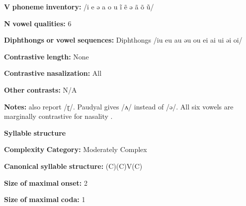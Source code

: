 \begin{styleBody}
\textbf{V} \textbf{phoneme} \textbf{inventory:} /i e ə a o u ĩ ẽ ə ã õ ũ/
\end{styleBody}

\begin{styleBody}
\textbf{N} \textbf{vowel} \textbf{qualities:} 6
\end{styleBody}

\begin{styleBody}
\textbf{Diphthongs} \textbf{or} \textbf{vowel} \textbf{sequences:} Diphthongs /iu eu au əu ou ei ai ui əi oi/
\end{styleBody}

\begin{styleBody}
\textbf{Contrastive} \textbf{length:} None
\end{styleBody}

\begin{styleBody}
\textbf{Contrastive} \textbf{nasalization:} All
\end{styleBody}

\begin{styleBody}
\textbf{Other} \textbf{contrasts:} N/A
\end{styleBody}

\begin{styleBody}
\textbf{Notes:} \citealt{KotapishKotapish1973} also report /ɽ/. Paudyal gives /ʌ/ instead of /ə/. All six vowels are marginally contrastive for nasality \citep[7]{Dhakal2012}.
\end{styleBody}

\begin{styleBody}
\textbf{Syllable} \textbf{structure}
\end{styleBody}

\begin{styleBody}
\textbf{Complexity} \textbf{Category:} Moderately Complex
\end{styleBody}

\begin{styleBody}
\textbf{Canonical} \textbf{syllable} \textbf{structure:} (C)(C)V(C) \citep[17-20]{Dhakal2012}
\end{styleBody}

\begin{styleBody}
\textbf{Size} \textbf{of} \textbf{maximal} \textbf{onset:} 2
\end{styleBody}

\begin{styleBody}
\textbf{Size} \textbf{of} \textbf{maximal} \textbf{coda:} 1
\end{styleBody}

